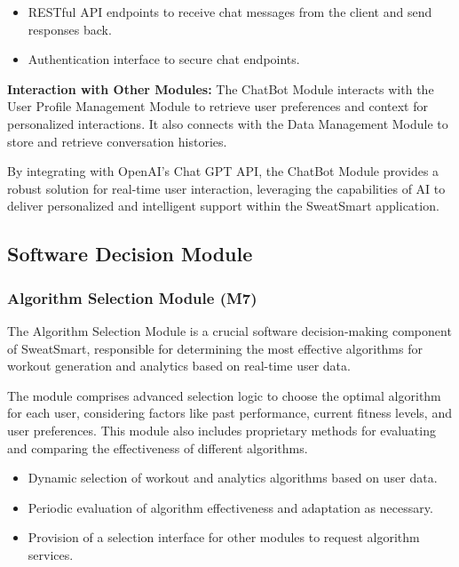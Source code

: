 \documentclass[12pt, titlepage]{article}
\begin{document}
\begin{description}[leftmargin=0pt]
\item[Interfaces:]
\end{description}
\begin{itemize}[leftmargin=*]
\item RESTful API endpoints to receive chat messages from the client and send responses back.
\item Authentication interface to secure chat endpoints.
\end{itemize}

\textbf{Interaction with Other Modules:} 
The ChatBot Module interacts with the User Profile Management Module to retrieve user preferences and context for personalized interactions. It also connects with the Data Management Module to store and retrieve conversation histories.

By integrating with OpenAI's Chat GPT API, the ChatBot Module provides a robust solution for real-time user interaction, leveraging the capabilities of AI to deliver personalized and intelligent support within the SweatSmart application.



\subsection{Software Decision Module}

\subsubsection{Algorithm Selection Module (M7)}

The Algorithm Selection Module is a crucial software decision-making component of SweatSmart, responsible for determining the most effective algorithms for workout generation and analytics based on real-time user data.

\begin{description}[leftmargin=0pt]
\item[Secrets:]
The module comprises advanced selection logic to choose the optimal algorithm for each user, considering factors like past performance, current fitness levels, and user preferences. This module also includes proprietary methods for evaluating and comparing the effectiveness of different algorithms.
\end{description}

\begin{description}[leftmargin=0pt]
\item[Services:]
\end{description}
\begin{itemize}[leftmargin=*]
\item Dynamic selection of workout and analytics algorithms based on user data.
\item Periodic evaluation of algorithm effectiveness and adaptation as necessary.
\item Provision of a selection interface for other modules to request algorithm services.
\end{itemize}
\end{document}
